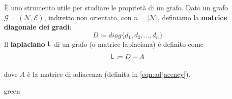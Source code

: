 \`E uno strumento utile per studiare le propriet\`a di un grafo.
 Dato un grafo $\mathcal{G} = (\mathcal{N}, \mathcal{E})$, indiretto non orientato, con $n=|\mathcal{N}|$, definiamo la \textbf{matrice diagonale dei gradi}:
\begin{equation}
    D \coloneqq diag\{d_1, d_2, \dots, d_n\}
\end{equation}
 Il \textbf{laplaciano} $\mathsf{L}$ di un grafo (o matrice laplaciana) \`e definito come 
\begin{equation}
    \mathsf{L} \coloneqq D - A
\end{equation}

dove $A$ \`e la matrice di adiacenza (definita in \ref{eqn:adjacency}).
\begin{mybox}{green}{}
\label{exmp:lapla}
\begin{minipage}{0.5\textwidth}
\begin{center}
\end{center}
\end{minipage}
\end{mybox}

